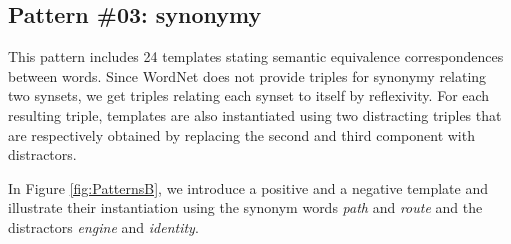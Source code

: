 \documentclass[11pt]{article}
\newcommand{\WORDNET}{WordNet}
\begin{document}
\subsection{Pattern \#03: synonymy}

This pattern includes 24 templates stating semantic equivalence correspondences between words. Since \WORDNET{} does not provide triples for synonymy relating two synsets, we get triples relating each synset to itself by reflexivity. For each resulting triple, templates are also instantiated using two distracting triples that are respectively obtained by replacing the second and third component with distractors.

In Figure \ref{fig:PatternsB}, we introduce a positive and a negative template and illustrate their instantiation using the synonym words {\it path} and {\it route} and the distractors {\it engine} and {\it identity}.
\end{document}
